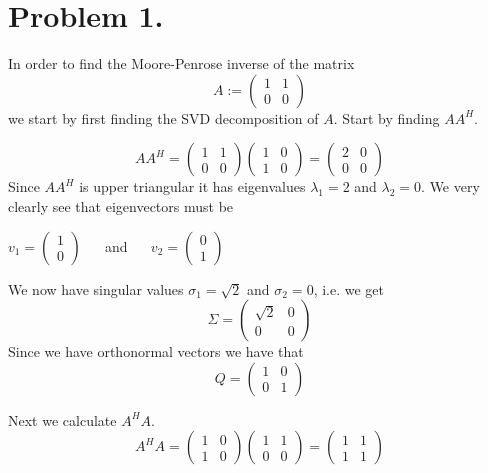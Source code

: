 \documentclass[a4paper,11pt]{article}
\begin{document}


\section*{Problem 1.}
In order to find the Moore-Penrose inverse of the matrix
\[
    A := \begin{pmatrix}
        1 & 1 \\ 
        0 & 0
    \end{pmatrix}
\]
we start by first finding the SVD decomposition of $A$. Start by finding $AA^H$.

\[
    AA^H = \begin{pmatrix} 1 & 1 \\ 0 & 0 \end{pmatrix} \begin{pmatrix} 1 & 0 \\ 1 & 0\end{pmatrix} = \begin{pmatrix} 2 & 0 \\ 0 & 0\end{pmatrix}
\]
Since $AA^H$ is upper triangular it has eigenvalues $\lambda_1 = 2$ and $\lambda_2 = 0$. We very clearly see that 
eigenvectors must be 
\begin{center}
    $v_1 = \begin{pmatrix}1 \\ 0\end{pmatrix}\:\:\:\:\:\:$ and $\:\:\:\:\:\:v_2 = \begin{pmatrix}0 \\ 1\end{pmatrix}$
\end{center}

We now have singular values $\sigma_1 = \sqrt{2}$ and $\sigma_2 = 0$, i.e. we get
\[
    \Sigma = \begin{pmatrix}
        \sqrt{2} & 0 \\
        0        & 0
    \end{pmatrix}
\]
Since we have orthonormal vectors we have that 
\[
    Q = \begin{pmatrix}
        1 & 0 \\ 0 & 1
    \end{pmatrix}
\]

Next we calculate $A^H A$.
\[
    A^HA = \begin{pmatrix} 1 & 0 \\ 1 & 0 \end{pmatrix} \begin{pmatrix} 1 & 1 \\ 0 & 0\end{pmatrix} 
         = \begin{pmatrix} 1 & 1 \\ 1 & 1\end{pmatrix}
\]
\end{document}
